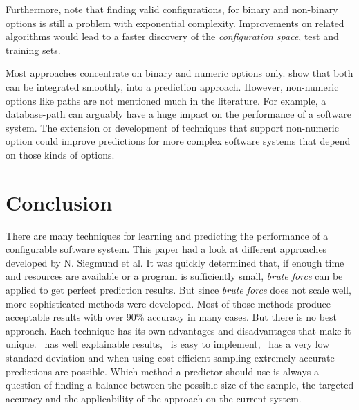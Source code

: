 Furthermore, \citet{PerformanceInflunceModels_Sigmund_2015} note that finding valid configurations, for binary and non-binary options is still a problem with exponential complexity. Improvements on related algorithms would lead to a faster discovery of the \textit{configuration space}, test and training sets.

Most approaches concentrate on binary and numeric options only. \citet{PerformanceInflunceModels_Sigmund_2015} show that both can be integrated smoothly, into a prediction approach. However, non-numeric options like paths are not mentioned much in the literature. For example, a database-path can arguably have a huge impact on the performance of a software system. The extension or development of techniques that support non-numeric option could improve predictions for more complex software systems that depend on those kinds of options.

\section{Conclusion}

There are many techniques for learning and predicting the performance of a configurable software system. This paper had a look at different approaches developed by N. Siegmund et al. It was quickly determined that, if enough time and resources are available or a program is sufficiently small, \textit{brute force} can be applied to get perfect prediction results. But since \textit{brute force} does not scale well, more sophisticated methods were developed. Most of those methods produce acceptable results with over 90\% accuracy in many cases. But there is no best approach. Each technique has its own advantages and disadvantages that make it unique. \AFID~has well explainable results, \VAPP~is easy to implement, \WHAT~has a very low standard deviation and when using cost-efficient sampling extremely accurate predictions are possible. Which method a predictor should use is always a question of finding a balance between the possible size of the sample, the targeted accuracy and the applicability of the approach on the current system.

